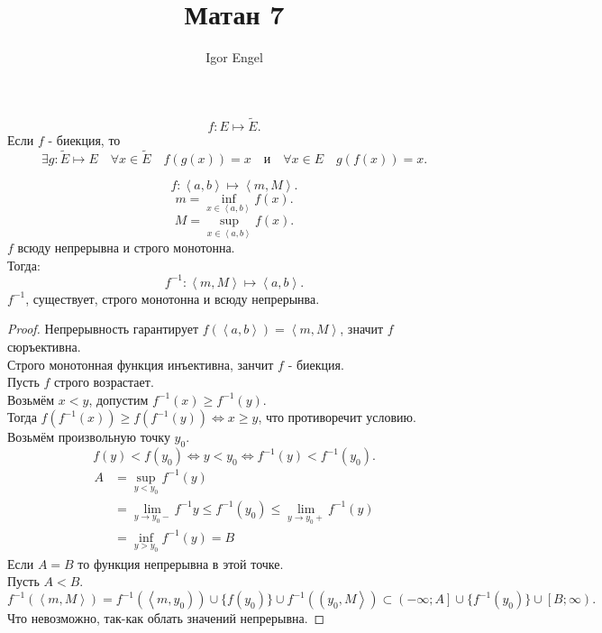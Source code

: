 \documentclass[11pt, oneside]{article}   	%
\title{Матан 7}
\author{Igor Engel}
\date{}
\begin{document}
\maketitle
\section{}
    
\begin{definition}
    \[ f: E \mapsto \tilde{E} .\]
    Если $f$ - биекция, то
    \[ \exists{g: \tilde{E} \mapsto E}\quad \forall{x\in \tilde{E}}\quad f(g(x)) = x\quad \text{и}\quad \forall{x\in E}\quad g(f(x)) = x   .\] 
\end{definition}
\begin{theorem}
    \[ f: \left<a, b\right> \mapsto \left<m, M\right> .\]
    \[ m =\inf_{x\in \left<a, b\right>} f(x) .\]
    \[ M = \sup_{x\in \left<a, b\right>} f(x) .\]
    $f$ всюду непрерывна и строго монотонна.\\
    Тогда:
    \[ f^{-1}: \left<m, M\right> \mapsto \left<a, b\right> .\]
    $f^{-1}$, существует, строго монотонна и всюду непрерынва.
    \begin{proof}
        Непрерывность гарантирует $f(\left<a,b\right>) = \left<m, M\right>$, значит $f$ сюръективна.\\
        Строго монотонная функция инъективна, занчит $f$ - биекция.\\
        Пусть $f$ строго возрастает.\\
        Возьмём $x<y$, допустим $f^{-1}(x) \ge f^{-1}(y)$.\\
        Тогда $f(f^{-1}(x)) \ge f(f^{-1}(y)) \iff x \ge y$, что противоречит условию.\\
        Возьмём произвольную точку $y_0$.\\
        \[ f(y) < f(y_0) \iff y < y_0 \iff f^{-1}(y) < f^{-1}(y_0).\]
        \begin{equation*}
            \begin{split}
                A &= \sup_{y<y_0} f^{-1}(y)\\
                  &= \lim\limits_{y \to y_0-} f^{-1} y \le f^{-1}(y_0) \le \lim\limits_{y \to y_0+} f^{-1}(y)\\ 
                  &= \inf_{y>y_0} f^{-1}(y) = B
            \end{split}
        \end{equation*}
        Если $A=B$ то функция непрерывна в этой точке.\\
        Пусть $A<B$.\\
        \[ f^{-1}\left( \left<m, M\right> \right) = f^{-1}\left( \left<m, y_0\right) \right) \cup \{f(y_0)\} \cup f^{-1}\left( \left(y_0, M\right> \right) \subset \left(-\infty; A\right] \cup \{f^{-1}(y_0)\} \cup \left[B; \infty\right)    .\]
        Что невозможно, так-как облать значений непрерывна.
    \end{proof}
\end{theorem}
\end{document}
